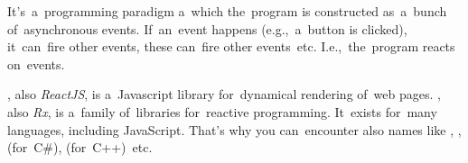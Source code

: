 \label{reactiveprogramming}
It's~a~programming paradigm a~which the~program is constructed as~a~bunch of~asynchronous events.
If~an~event happens (e.g.,~a~button is clicked), it~can~fire other events, these can~fire other events~etc.
I.e.,~the~program reacts on~events.

\begin{itemize}
    , also \textit{ReactJS}, is a~Javascript library for~dynamical rendering of~web pages.
    , also \textit{Rx}, is a~family of~libraries for~reactive programming.
            It~exists for~many languages, including JavaScript.
            That's why you can~encounter also names like , ,  \mbox{(for C\#)},  \mbox{(for C++) etc.}
\end{itemize}
